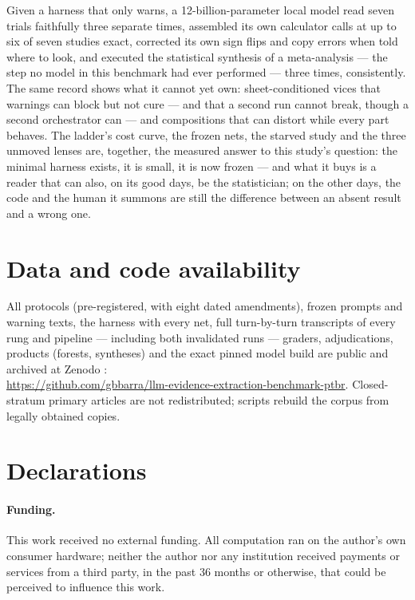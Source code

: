 \documentclass[11pt]{article}
\begin{document}
Given a harness that only warns, a 12-billion-parameter local model read seven trials faithfully three separate times, assembled its own calculator calls at up to six of seven studies exact, corrected its own sign flips and copy errors when told where to look, and executed the statistical synthesis of a meta-analysis --- the step no model in this benchmark had ever performed --- three times, consistently. The same record shows what it cannot yet own: sheet-conditioned vices that warnings can block but not cure --- and that a second run cannot break, though a second orchestrator can --- and compositions that can distort while every part behaves. The ladder's cost curve, the frozen nets, the starved study and the three unmoved lenses are, together, the measured answer to this study's question: the minimal harness exists, it is small, it is now frozen --- and what it buys is a reader that can also, on its good days, be the statistician; on the other days, the code and the human it summons are still the difference between an absent result and a wrong one.

\section*{Data and code availability}

All protocols (pre-registered, with eight dated amendments), frozen prompts and warning texts, the harness with every net, full turn-by-turn transcripts of every rung and pipeline --- including both invalidated runs --- graders, adjudications, products (forests, syntheses) and the exact pinned model build are public and archived at Zenodo \citep{barra2026extrai}:\\ {\small\url{https://github.com/gbbarra/llm-evidence-extraction-benchmark-ptbr}}. Closed-stratum primary articles are not redistributed; scripts rebuild the corpus from legally obtained copies.

\section*{Declarations}

\paragraph{Funding.} This work received no external funding. All computation ran on the author's own consumer hardware; neither the author nor any institution received payments or services from a third party, in the past 36 months or otherwise, that could be perceived to influence this work.
\end{document}
